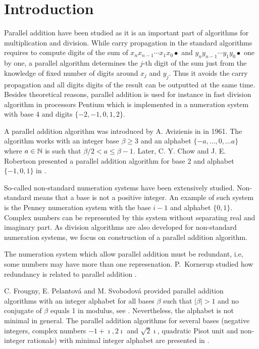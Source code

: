 \documentclass[11pt,a4paper]{report}	%
\theoremstyle{definition}
\begin{document}
\tableofcontents


\chapter*{Introduction}
Parallel addition have been studied as it is an important part of algorithms for multiplication and division. 
While carry propagation in the standard algorithms requires to compute digits of the sum of $x_n x_{n-1}\cdots x_1 x_0 \bullet$ and $y_n y_{n-1}\cdots y_1 y_0 \bullet$  one by one, a parallel algorithm determines the $j$-th digit of the sum just from the knowledge of fixed number of digits around $x_j$ and $y_j$. Thus it avoids the carry propagation and all digits digits of the result can be outputted at the same time. Besides theoretical reasons, parallel addition is used for instance in fast division algorithm in processors Pentium which is implemented in a numeration system with base 4 and digits $\{-2,-1,0,1,2\}$.

A parallel addition algorithm  was introduced by A. Avizienis in \cite{avizienis} in 1961. The algorithm works with an integer base $\beta\geq3$ and an alphabet $\{-a, \dots, 0, \dots a\}$ where $a\in\mathbb{N}$ is such that $\beta/2 <a \leq \beta-1$. Later, C. Y. Chow and J. E. Robertson presented a parallel addition algorithm for  base 2 and alphabet $\{-1,0,1\}$ in \cite{chow}.

So-called non-standard numeration systems have been extensively studied. Non-standard means that a base is not a positive integer. An example of such system is the Penney numeration system with the base $i-1$ and alphabet $\{0,1\}$. Complex numbers can be represented by this system without separating real and imaginary part. As division algorithms are also developed for non-standard numeration systems, we focus on construction of a parallel addition algorithm.

The numeration system which allow parallel addition must be redundant, i.e, some numbers may have more than one represenation. P.~Kornerup studied how  redundancy is related to parallel addition \cite{kornerup}. 

C. Frougny, E. Pelantov\'a and M. Svobodov\'a provided parallel addition algorithms with an integer alphabet for all bases $\beta$ such that $|\beta|>1$ and no conjugate of $\beta$ equals 1 in modulus, see \cite{parAddNS}. Nevertheless, the alphabet is not minimal in general.
 The parallel addition algorithms for several bases (negative integers, complex numbers $-1+\imath, 2\imath$ and $\sqrt{2}\imath$, quadratic Pisot unit and  non-integer rationals) with minimal integer alphabet are presented in \cite{minAlph}.
\end{document}
